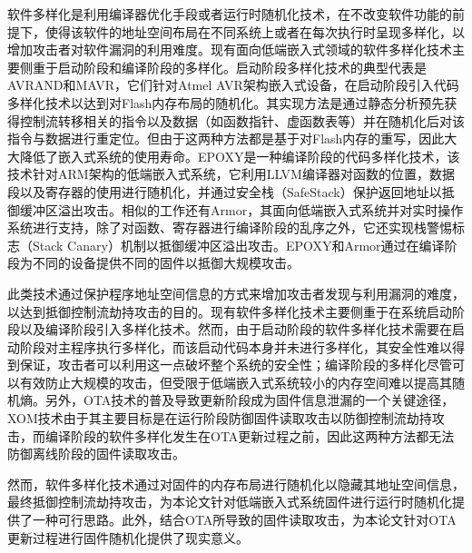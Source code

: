 \documentclass[12pt,a4paper]{ctexart}
\numberwithin{figure}{section}
\begin{document}
\par 软件多样化是利用编译器优化手段或者运行时随机化技术，在不改变软件功能的前提下，使得该软件的地址空间布局在不同系统上或者在每次执行时呈现多样化，以增加攻击者对软件漏洞的利用难度。现有面向低端嵌入式领域的软件多样化技术主要侧重于启动阶段和编译阶段的多样化。启动阶段多样化技术的典型代表是AVRAND\cite{pastrana2016avrand}和MAVR\cite{habibi2015mavr}，它们针对Atmel AVR架构嵌入式设备，在启动阶段引入代码多样化技术以达到对Flash内存布局的随机化。其实现方法是通过静态分析预先获得控制流转移相关的指令以及数据（如函数指针、虚函数表等）并在随机化后对该指令与数据进行重定位。但由于这两种方法都是基于对Flash内存的重写，因此大大降低了嵌入式系统的使用寿命。EPOXY\cite{7958583}是一种编译阶段的代码多样化技术，该技术针对ARM架构的低端嵌入式系统，它利用LLVM编译器对函数的位置，数据段以及寄存器的使用进行随机化，并通过安全栈（SafeStack）\cite{kuznetzov2018code}保护返回地址以抵御缓冲区溢出攻击。相似的工作还有Armor\cite{8806725}，其面向低端嵌入式系统并对实时操作系统进行支持，除了对函数、寄存器进行编译阶段的乱序之外，它还实现栈警惕标志（Stack Canary）机制以抵御缓冲区溢出攻击。EPOXY和Armor通过在编译阶段为不同的设备提供不同的固件以抵御大规模攻击。
\par 此类技术通过保护程序地址空间信息的方式来增加攻击者发现与利用漏洞的难度，以达到抵御控制流劫持攻击的目的。现有软件多样化技术主要侧重于在系统启动阶段以及编译阶段引入多样化技术。然而，由于启动阶段的软件多样化技术需要在启动阶段对主程序执行多样化，而该启动代码本身并未进行多样化，其安全性难以得到保证，攻击者可以利用这一点破坏整个系统的安全性；编译阶段的多样化尽管可以有效防止大规模的攻击，但受限于低端嵌入式系统较小的内存空间难以提高其随机熵。另外，OTA技术的普及导致更新阶段成为固件信息泄漏的一个关键途径，XOM技术由于其主要目标是在运行阶段防御固件读取攻击以防御控制流劫持攻击，而编译阶段的软件多样化发生在OTA更新过程之前，因此这两种方法都无法防御离线阶段的固件读取攻击。
\par 然而，软件多样化技术通过对固件的内存布局进行随机化以隐藏其地址空间信息，最终抵御控制流劫持攻击，为本论文针对低端嵌入式系统固件进行运行时随机化提供了一种可行思路。此外，结合OTA所导致的固件读取攻击，为本论文针对OTA更新过程进行固件随机化提供了现实意义。
\end{document}

